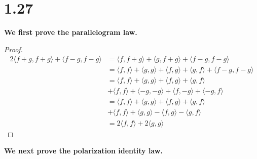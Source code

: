 \documentclass[10pt]{article}
\begin{document}
\section*{1.27}

\textbf{We first prove the parallelogram law.}

\begin{proof}
    \begin{alignat*}{2}
        \langle f+g,f+g\rangle + \langle f-g,f-g\rangle &= \langle f,f+g\rangle + \langle g,f+g\rangle + \langle f-g,f-g\rangle\\
        &= \langle f,f\rangle + \langle g,g\rangle + \langle f,g\rangle + \langle g,f\rangle + \langle f-g,f-g\rangle\\
        &= \langle f,f\rangle + \langle g,g\rangle + \langle f,g\rangle + \langle g,f\rangle\\
        &+ \langle f,f\rangle + \langle -g,-g\rangle + \langle f,-g\rangle + \langle -g,f\rangle\\
        &= \langle f,f\rangle + \langle g,g\rangle + \langle f,g\rangle + \langle g,f\rangle\\
        &+ \langle f,f\rangle + \langle g,g\rangle - \langle f,g\rangle - \langle g,f\rangle\\
        &= 2\langle f,f\rangle + 2\langle g,g\rangle
    \end{alignat*}
\end{proof}

\noindent
\textbf{We next prove the polarization identity law.}
\end{document}
